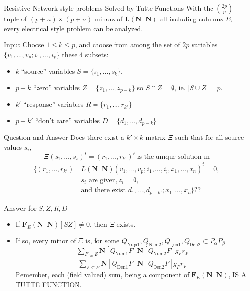 \documentclass{beamer}
\newcommand{\ext}[1]{\ensuremath{\mathbf{#1}}}
\begin{document}
\begin{frame}{Resistive Network style problems Solved by Tutte Functions}
  With the $\binom{2p}{p}$ tuple of $(p+n)\times(p+n)$
  minors of $\ext{L}(\ext{N}\;\;\ext{N})$ all including columns $E$, every electrical style
  problem can be analyzed.
  \begin{block}{Input}
    Choose $1\le k\le p$, and choose from among the set of $2p$ variables
    $\{v_1,...,v_p;i_1,...,i_p\}$ these 4 subsets:
    \begin{itemize}
    \item $k$ ``source'' variables $S=\{s_1,...,s_k\}$.
    \item $p-k$ ``zero'' variables $Z=\{z_1,...,z_{p-k}\}$ so $S\cap Z=\emptyset$, ie. $|S\cup Z|=p$.
    \item $k'$ ``response'' variables $R=\{r_1,...,r_{k'}\}$
    \item $p-k'$ ``don't care'' variables $D=\{d_1,...,d_{p-k}\}$ 
    \end{itemize}
  \end{block}
\end{frame}

\begin{frame}{Question and Answer}
    Does there exist a $k'\times k$ matrix $\Xi$ such that for all source values $s_i$,
    \[
    \Xi(s_1,...,s_k)^t = (r_1,...,r_{k'})^t \text{\ is the unique solution in}
    \]
    \[
    \begin{split}    \{ (r_1,...,r_{k'}) |& L( \ext{N}\;\;\ext{N} )(v_1,...,v_p;i_1,...,i_;,x_1,...,x_n)^t = 0,\\
      & s_i \text{\ are given}, z_i=0,\\
      &\text{and there exist\ } d_1,...,d_{p-k'};x_1,...,x_n\}??
    \end{split}
    \]
  \begin{block}{Answer for $S,Z,R,D$}
    \begin{itemize}
     \item
        If $\ext{F}_E(\ext{N}\;\;\ext{N})[SZ]\not=0$, then $\Xi$ exists.

      \item
        If so, every minor of $\Xi$ is, for some
        $Q_{\text{Num1}},Q_{\text{Num2}},Q_{\text{Den1}},Q_{\text{Den2}}\subset P_\alpha P_\beta$
        \[
        \frac{\sum_{F\subseteq E}\ext{N}[Q_{\text{Num1}}F]\ext{N}[Q_{\text{Num2}}F]g_Fr_{\overline{F}}}
          {\sum_{F\subseteq E}\ext{N}[Q_{\text{Den1}}F]\ext{N}[Q_{\text{Den2}}F]g_Fr_{\overline{F}}}
          \]
          Remember, each (field valued) sum, being a component of
          $\ext{F}_E(\ext{N}\;\;\ext{N})$,  IS A TUTTE FUNCTION.
    \end{itemize}
  \end{block}
\end{frame}
          
\end{document}
